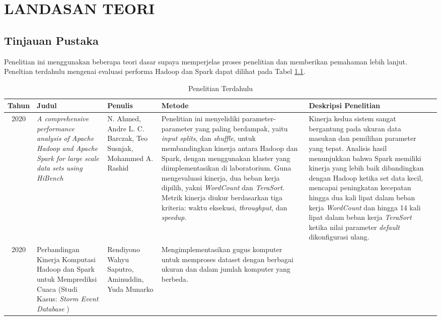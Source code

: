\chapter{LANDASAN TEORI}

\section{Tinjauan Pustaka}
Penelitian ini menggunakan beberapa teori dasar supaya memperjelas proses penelitian dan memberikan pemahaman lebih lanjut. Peneltian terdahulu mengenai evaluasi performa Hadoop dan Spark dapat dilihat pada Tabel \ref{table:penelitian-dulu}.

\begin{table}[h]
\caption{Penelitian Terdahulu}
\label{table:penelitian-dulu}
\scriptsize
\begin{tabularx}{\textwidth}{c*{5}{>{\raggedright\arraybackslash}X}}
\toprule
\textbf{Tahun} & \textbf{Judul} & \textbf{Penulis} & \textbf{Metode} 
  & \textbf{Deskripsi Penelitian} \\
\midrule
2020 & \textit{A comprehensive performance analysis of Apache Hadoop and Apache Spark for large scale data sets using HiBench \cite{ahmedComprehensivePerformanceAnalysis2020}} 
  & N. Ahmed, Andre L. C. Barczak, Teo Susnjak, Mohammed A. Rashid
  & Penelitian ini menyelidiki parameter-parameter yang paling berdampak, yaitu \textit{input splits}, dan \textit{shuffle}, untuk membandingkan kinerja antara Hadoop dan Spark, dengan menggunakan klaster yang diimplementasikan di laboratorium. Guna mengevaluasi kinerja, dua beban kerja dipilih, yakni \textit{WordCount} dan  \textit{TeraSort}. Metrik kinerja diukur berdasarkan tiga kriteria: waktu eksekusi, \textit{throughput}, dan \textit{speedup}. 
  & Kinerja kedua sistem sangat bergantung pada ukuran data masukan dan pemilihan parameter yang tepat. Analisis hasil menunjukkan bahwa Spark memiliki kinerja yang lebih baik dibandingkan dengan Hadoop ketika set data kecil, mencapai peningkatan kecepatan hingga dua kali lipat dalam beban kerja \textit{WordCount} dan hingga 14 kali lipat dalam beban kerja \textit{TeraSort} ketika nilai parameter \textit{default} dikonfigurasi ulang. \\
2020 & Perbandingan Kinerja Komputasi Hadoop dan Spark untuk Memprediksi Cuaca (Studi Kasus: \textit{Storm Event Database} \cite{saputroPerbandinganKinerjaKomputasi2020}) 
  & Rendiyono Wahyu Saputro, Aminuddin, Yuda Munarko 
  & Mengimplementasikan gugus komputer untuk memproses dataset dengan berbagai ukuran dan dalam jumlah komputer yang berbeda. 

\end{tabularx}
\end{table}

